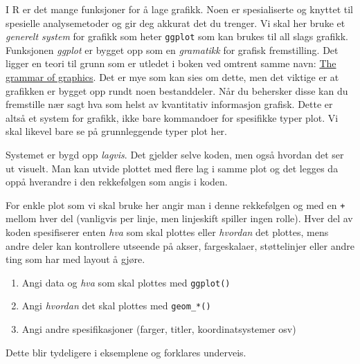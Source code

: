 \documentclass[
  letterpaper,
  DIV=11,
  numbers=noendperiod]{scrreprt}
\providecommand{\tightlist}{%
  \setlength{\itemsep}{0pt}\setlength{\parskip}{0pt}}\usepackage{longtable,booktabs,array}
\theoremstyle{definition}
\theoremstyle{remark}
\begin{document}
I R er det mange funksjoner for å lage grafikk. Noen er spesialiserte og
knyttet til spesielle analysemetoder og gir deg akkurat det du trenger.
Vi skal her bruke et \emph{generelt system} for grafikk som heter
\texttt{ggplot} som kan brukes til all slags grafikk. Funksjonen
\emph{ggplot} er bygget opp som en \emph{gramatikk} for grafisk
fremstilling. Det ligger en teori til grunn som er utledet i boken ved
omtrent samme navn:
\href{https://link.springer.com/book/10.1007/0-387-28695-0}{The grammar
of graphics}. Det er mye som kan sies om dette, men det viktige er at
grafikken er bygget opp rundt noen bestanddeler. Når du behersker disse
kan du fremstille nær sagt hva som helst av kvantitativ informasjon
grafisk. Dette er altså et system for grafikk, ikke bare kommandoer for
spesifikke typer plot. Vi skal likevel bare se på grunnleggende typer
plot her.

Systemet er bygd opp \emph{lagvis}. Det gjelder selve koden, men også
hvordan det ser ut visuelt. Man kan utvide plottet med flere lag i samme
plot og det legges da oppå hverandre i den rekkefølgen som angis i
koden.

For enkle plot som vi skal bruke her angir man i denne rekkefølgen og
med en \texttt{+} mellom hver del (vanligvis per linje, men linjeskift
spiller ingen rolle). Hver del av koden spesifiserer enten \emph{hva}
som skal plottes eller \emph{hvordan} det plottes, mens andre deler kan
kontrollere utseende på akser, fargeskalaer, støttelinjer eller andre
ting som har med layout å gjøre.

\begin{enumerate}
\def\labelenumi{\arabic{enumi})}
\tightlist
\item
  Angi data og \emph{hva} som skal plottes med \texttt{ggplot()}
\item
  Angi \emph{hvordan} det skal plottes med \texttt{geom\_*()}
\item
  Angi andre spesifikasjoner (farger, titler, koordinatsystemer osv)
\end{enumerate}

Dette blir tydeligere i eksemplene og forklares underveis.
\end{document}
